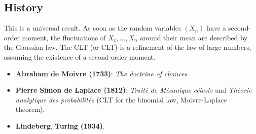 \subsection*{History}%
This is a universal result. As soon as the random variables $(X_n)$ have a second-order moment, the fluctuations of $X_1, \dots, X_n$ around their mean are described by the Gaussian law. The CLT (or CLT) is a refinement of the law of large numbers, assuming the existence of a second-order moment.%
\begin{itemize}
    \item \textbf{Abraham de Moivre (1733)}: \textit{The doctrine of chances}.
    \item \textbf{Pierre Simon de Laplace (1812)}: \textit{Traité de Mécanique céleste} and \textit{Théorie analytique des probabilités} (CLT for the binomial law, Moivre-Laplace theorem).
    \item \textbf{Lindeberg}, \textbf{Turing (1934)}.
\end{itemize}%
